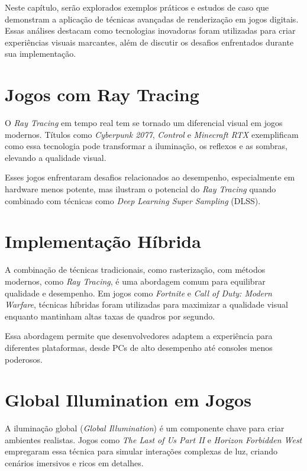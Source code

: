 \makeatletter
\renewcommand{\chapter}{%
  \if@openright\cleardoublepage\else\clearpage\fi %
  \secdef{\@chapter}{\@schapter}}
\makeatother
\chapter{Estudos de Caso e Aplicações Práticas}

Neste capítulo, serão explorados exemplos práticos e estudos de caso que demonstram a aplicação de técnicas avançadas de renderização em jogos digitais. Essas análises destacam como tecnologias inovadoras foram utilizadas para criar experiências visuais marcantes, além de discutir os desafios enfrentados durante sua implementação.

\section{Jogos com Ray Tracing}
O \textit{Ray Tracing} em tempo real tem se tornado um diferencial visual em jogos modernos. Títulos como \textit{Cyberpunk 2077}, \textit{Control} e \textit{Minecraft RTX} exemplificam como essa tecnologia pode transformar a iluminação, os reflexos e as sombras, elevando a qualidade visual.

Esses jogos enfrentaram desafios relacionados ao desempenho, especialmente em hardware menos potente, mas ilustram o potencial do \textit{Ray Tracing} quando combinado com técnicas como \textit{Deep Learning Super Sampling} (DLSS).

\section{Implementação Híbrida}
A combinação de técnicas tradicionais, como rasterização, com métodos modernos, como \textit{Ray Tracing}, é uma abordagem comum para equilibrar qualidade e desempenho. Em jogos como \textit{Fortnite} e \textit{Call of Duty: Modern Warfare}, técnicas híbridas foram utilizadas para maximizar a qualidade visual enquanto mantinham altas taxas de quadros por segundo.

Essa abordagem permite que desenvolvedores adaptem a experiência para diferentes plataformas, desde PCs de alto desempenho até consoles menos poderosos.

\section{Global Illumination em Jogos}
A iluminação global (\textit{Global Illumination}) é um componente chave para criar ambientes realistas. Jogos como \textit{The Last of Us Part II} e \textit{Horizon Forbidden West} empregaram essa técnica para simular interações complexas de luz, criando cenários imersivos e ricos em detalhes.

